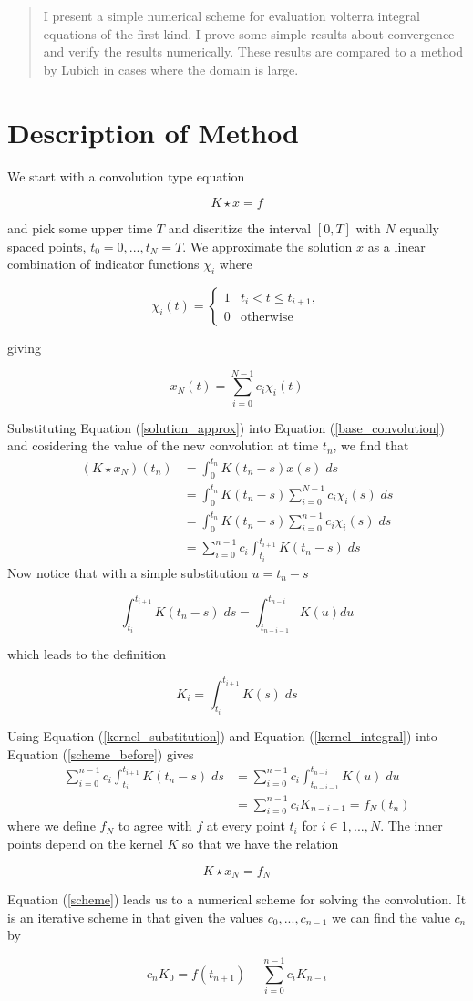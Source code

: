 \documentclass[11pt]{article}
\numberwithin{equation}{section}
\theoremstyle{definition}
\newcommand{\eqn}[2]{
  \begin{equation}
    \label{#1}
    #2
  \end{equation}
}
\newcommand{\eqr}[1]{Equation (\ref{#1})}
\begin{document}
\maketitle
\begin{abstract}
I present a simple numerical scheme for evaluation volterra integral
equations of the first kind. I prove some simple results about
convergence and verify the results numerically. These results are
compared to a method by Lubich in cases where the domain is large.
\end{abstract}
\setcounter{tocdepth}{1}
\tableofcontents
\lstlistoflistings
\listoftables
\section{Description of Method}
We start with a convolution type equation
\eqn{base_convolution}{
  K \star x = f
}
and pick some upper time $T$ and discritize the interval $[0, T]$ with $N$
equally spaced points, $t_0 = 0, ..., t_N = T$. We approximate the solution $x$
as a linear combination of indicator functions $\chi_i$ where
\eqn{indicator_defn}{
  \chi_i(t)
  =
  \left\{
  \begin{array}{ll}
    1 & t_{i} < t \leq t_{i+1} , \\
    0 & \text{otherwise}
  \end{array}
  \right.
}
giving
\eqn{solution_approx}{
  x_N(t) = \sum_{i=0}^{N-1} c_i \chi_i(t)
}
Substituting \eqr{solution_approx} into \eqr{base_convolution} and cosidering
the value of the new convolution at time $t_n$, we find that
\begin{align}
\nonumber             (K \star x_N)(t_n)
                        &= \int_0^{t_n} K(t_n - s)x(s)\; ds \\
\nonumber               &= \int_0^{t_n} K(t_n - s) \sum_{i=0}^{N-1} c_i \chi_i(s)\; ds \\
\nonumber               &= \int_0^{t_n} K(t_n - s) \sum_{i=0}^{n-1} c_i \chi_i(s)\; ds \\
\label{scheme_before}   &= \sum_{i=0}^{n-1} c_i \int_{t_i}^{t_{i+1}} K(t_n - s)\; ds
\end{align}
Now notice that with a simple substitution $u = t_n - s$
\eqn{kernel_substitution}{
  \int_{t_i}^{t_{i+1}}K(t_n - s)\; ds = \int_{t_{n-i-1}}^{t_{n-i}} K(u) du
}
which leads to the definition
\eqn{kernel_integral}{
  K_i = \int_{t_i}^{t_{i+1}} K(s)\; ds
}
Using \eqr{kernel_substitution} and \eqr{kernel_integral} into \eqr{scheme_before}
gives
\begin{align}
\nonumber       \sum_{i=0}^{n-1} c_i \int_{t_i}^{t_{i+1}} K(t_n - s)\; ds
                  &= \sum_{i=0}^{n-1} c_i \int_{t_{n-i-1}}^{t_{n-i}} K(u)\; du\\
\label{scheme}    &= \sum_{i=0}^{n-1} c_i K_{n-i-1} = f_N(t_n)
\end{align}
where we define $f_N$ to agree with $f$ at every point $t_i$ for $i \in 1, ..., N$.
The inner points depend on the kernel $K$ so that we have the relation
\eqn{approx_relation}{
  K \star x_N = f_N
}
\eqr{scheme} leads us to a numerical scheme for solving the convolution. It is
an iterative scheme in that given the values $c_0, ..., c_{n-1}$ we can find
the value $c_n$ by
\eqn{specific_term}{
  c_nK_0 = f(t_{n+1}) - \sum_{i=0}^{n-1} c_i K_{n-i}
}
\end{document}
